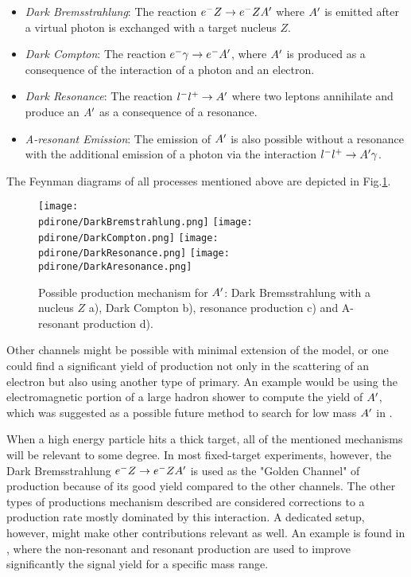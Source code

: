 \begin{itemize}
\item \textit{Dark Bremsstrahlung}: The reaction $e^- Z \to e^- Z A'$ where $A'$ is emitted after a virtual photon is exchanged with a target nucleus $Z$.
\item \textit{Dark Compton}: The reaction $e^- \gamma \to e^- A'$, where $A'$ is produced as a consequence of the interaction of a photon and an electron.
\item \textit{Dark Resonance}: The reaction $l^- l^+ \to A'$ where two leptons annihilate and produce an $A'$ as a consequence of a resonance.
\item \textit{A-resonant Emission}: The emission of $A'$ is also possible without a resonance with the additional emission of a photon via the interaction $l^- l^+ \to A' \gamma$.
\end{itemize}

The Feynman diagrams of all processes mentioned above are depicted in Fig.\ref{fig:dm-production-mechanism}.

\begin{figure}
\centering
\texttt{[image: \\pdirone/DarkBremstrahlung.png]}
\texttt{[image: \\pdirone/DarkCompton.png]}
\texttt{[image: \\pdirone/DarkResonance.png]}
\texttt{[image: \\pdirone/DarkAresonance.png]}
\caption{Possible production mechanism for $A'$: Dark Bremsstrahlung with a nucleus $Z$ a), Dark Compton b), resonance production c) and A-resonant production d).}
\label{fig:dm-production-mechanism}
\end{figure}

Other channels might be possible with minimal extension of the model, or one could find a significant yield of production not only in the scattering of an electron but also using another type of primary. An example would be using the electromagnetic portion of a large hadron shower to compute the yield of $A'$, which was suggested as a possible future method to search for low mass $A'$ in \cite{Celentano:2020vtu}.

When a high energy particle hits a thick target, all of the mentioned mechanisms will be relevant to some degree.
In most fixed-target experiments, however, the Dark Bremsstrahlung $e^- Z \to e^- Z A'$ is used as the "Golden Channel" of production because of its good yield compared to the other channels. The other types of productions mechanism described are considered corrections to a production rate mostly dominated by this interaction. A dedicated setup, however, might make other contributions relevant as well. An example is found in \cite{Marsicano_2018}, where the non-resonant and resonant production are used to improve significantly the signal yield for a specific mass range.

